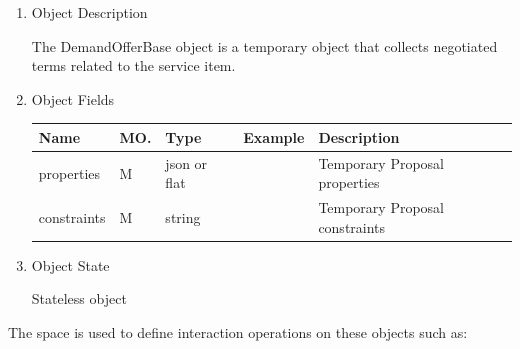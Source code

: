 \begin{enumerate}
\begin{enumerate}

\item Object Description

The DemandOfferBase object is a temporary object that collects negotiated terms related to the service item.

\item Object Fields

\begin{center}
\begin{tabular}{|p{3cm}|l|p{3cm}|p{3cm}|p{4cm}|} 
\hline
\rowcolor{lightgray}	Name	& MO.	& Type	& Example & 	Description \\
\hline

properties	& M	& 	json or flat	&		&  Temporary Proposal properties \\ 

\hline

constraints	& M	& 	string	&		&	Temporary Proposal constraints \\ 

\hline

\end{tabular}
\end{center}

\item Object State

Stateless object

\end{enumerate}

\end{enumerate}

\break

The space is used to define interaction operations on these objects such as:

